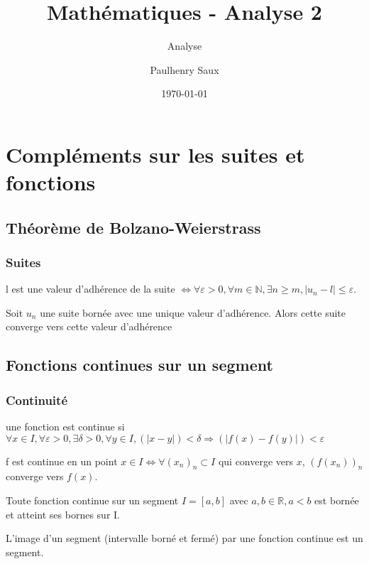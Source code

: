 \documentclass[french]{yLectureNote}
\title{Mathématiques - Analyse 2}
\subtitle{Analyse}
\author{Paulhenry Saux}
\date{\today}
\begin{document}
\setcounter{chapter}{2}
	\chapter{Compléments sur les suites et fonctions }
\section{Théorème de Bolzano-Weierstrass}
\subsection{Suites}
\begin{proposition}
l est une valeur d'adhérence de la suite \(\iff \forall \varepsilon >0,\forall m\in\mathbb{N},\exists n\geq m, |u_n-l|\leq \varepsilon\).
\end{proposition}
\begin{proposition}
Soit \(u_n\) une suite bornée avec une unique valeur d'adhérence. Alors cette suite converge vers cette valeur d'adhérence
\end{proposition}
\section{Fonctions continues sur un segment}
\subsection{Continuité}
\begin{definition}[Continuité]
une fonction est continue si \(\forall x\in I,\forall \varepsilon>0,\exists \delta>0,\forall y\in I, (|x-y|)<\delta \Rightarrow (|f(x)-f(y)|)<\varepsilon\)
\end{definition}
\begin{proposition}
f est continue en un point \(x\in I \iff \forall (x_n)_n \subset I\) qui converge vers \(x\), \((f(x_n))_n\) converge vers \(f(x)\).
\end{proposition}
\begin{proposition}
Toute fonction continue sur un segment \(I=[a,b]\) avec \(a,b\in\mathbb{R}, a<b\) est bornée et atteint ses bornes sur I.
\end{proposition}
\begin{theorem}
 L'image d'un segment  (intervalle borné et fermé) par une fonction continue est un segment.
\end{theorem}
\end{document}
